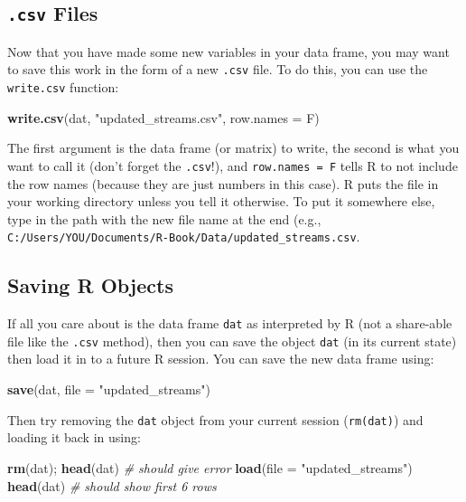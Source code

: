\documentclass[]{book}
\newenvironment{Shaded}{\begin{snugshade}}{\end{snugshade}}
\newcommand{\CommentTok}[1]{\textcolor[rgb]{0.56,0.35,0.01}{\textit{#1}}}
\newcommand{\DataTypeTok}[1]{\textcolor[rgb]{0.13,0.29,0.53}{#1}}
\newcommand{\KeywordTok}[1]{\textcolor[rgb]{0.13,0.29,0.53}{\textbf{#1}}}
\newcommand{\NormalTok}[1]{#1}
\newcommand{\StringTok}[1]{\textcolor[rgb]{0.31,0.60,0.02}{#1}}
\begin{document}
\hypertarget{csv-files}{%
\subsection{\texorpdfstring{\texttt{.csv} Files}{.csv Files}}\label{csv-files}}

Now that you have made some new variables in your data frame, you may want to save this work in the form of a new \texttt{.csv} file. To do this, you can use the \texttt{write.csv} function:

\begin{Shaded}
\begin{Highlighting}[]
\KeywordTok{write.csv}\NormalTok{(dat, }\StringTok{"updated_streams.csv"}\NormalTok{, }\DataTypeTok{row.names =}\NormalTok{ F)}
\end{Highlighting}
\end{Shaded}

The first argument is the data frame (or matrix) to write, the second is what you want to call it (don't forget the \texttt{.csv}!), and \texttt{row.names\ =\ F} tells R to not include the row names (because they are just numbers in this case). R puts the file in your working directory unless you tell it otherwise. To put it somewhere else, type in the path with the new file name at the end (e.g., \texttt{C:/Users/YOU/Documents/R-Book/Data/updated\_streams.csv}.

\hypertarget{saving-r-objects}{%
\subsection{Saving R Objects}\label{saving-r-objects}}

If all you care about is the data frame \texttt{dat} as interpreted by R (not a share-able file like the \texttt{.csv} method), then you can save the object \texttt{dat} (in its current state) then load it in to a future R session. You can save the new data frame using:

\begin{Shaded}
\begin{Highlighting}[]
\KeywordTok{save}\NormalTok{(dat, }\DataTypeTok{file =} \StringTok{"updated_streams"}\NormalTok{)}
\end{Highlighting}
\end{Shaded}

Then try removing the \texttt{dat} object from your current session (\texttt{rm(dat)}) and loading it back in using:

\begin{Shaded}
\begin{Highlighting}[]
\KeywordTok{rm}\NormalTok{(dat); }\KeywordTok{head}\NormalTok{(dat)  }\CommentTok{# should give error}
\KeywordTok{load}\NormalTok{(}\DataTypeTok{file =} \StringTok{"updated_streams"}\NormalTok{)}
\KeywordTok{head}\NormalTok{(dat) }\CommentTok{# should show first 6 rows}
\end{Highlighting}
\end{Shaded}
\end{document}
